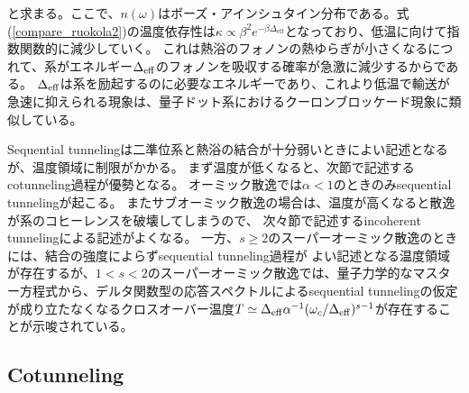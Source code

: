 と求まる。ここで、$n(\omega)$はボーズ・アインシュタイン分布である。式(\ref{compare_ruokola2})の温度依存性は$\kappa\propto\beta^2e^{-\beta\Delta_{\mathrm{eff}}}$となっており、低温に向けて指数関数的に減少していく。
これは熱浴のフォノンの熱ゆらぎが小さくなるにつれて、系がエネルギー$\Delta_{\rm eff}$のフォノンを吸収する確率が急激に減少するからである。
$\Delta_{\rm eff}$は系を励起するのに必要なエネルギーであり、これより低温で輸送が急速に抑えられる現象は、量子ドット系におけるクーロンブロッケード現象に類似している。

Sequential tunnelingは二準位系と熱浴の結合が十分弱いときによい記述となるが、温度領域に制限がかかる。
まず温度が低くなると、次節で記述するcotunneling過程が優勢となる。
オーミック散逸では$\alpha<1$のときのみsequential tunnelingが起こる。
またサブオーミック散逸の場合は、温度が高くなると散逸が系のコヒーレンスを破壊してしまうので、
次々節で記述するincoherent tunnelingによる記述がよくなる。
一方、$s\geq2$のスーパーオーミック散逸のときには、結合の強度によらずsequential tunneling過程が
よい記述となる温度領域が存在するが、$1<s<2$のスーパーオーミック散逸では、量子力学的なマスター方程式から、デルタ関数型の応答スペクトルによるsequential tunnelingの仮定が成り立たなくなるクロスオーバー温度$T\simeq\Delta_{\rm eff}\alpha^{-1}(\omega_c/\Delta_{\rm eff})^{s-1}$が存在することが示唆されている\cite{Leggett87}。

\subsection{Cotunneling}

